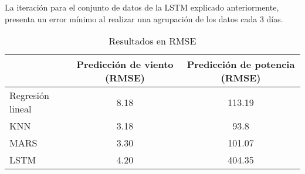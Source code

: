 \documentclass[journal]{IEEEtran}
\begin{document}
La iteración para el conjunto de datos de la LSTM explicado anteriormente, presenta un error mínimo al realizar una agrupación de los datos cada 3 días.

\begin{table}[ht]
\centering
\caption{Resultados en RMSE}\label{t:resRMSE}
\begin{tabular}{|l|c|c|}
\hline
& Predicción de viento (RMSE) & Predicción de potencia (RMSE)\\ \hline
Regresión lineal & 8.18 & 113.19 \\ \hline
KNN & 3.18 & 93.8 \\ \hline
MARS & 3.30 & 101.07 \\ \hline
LSTM & 4.20 & 404.35 \\ \hline
\end{tabular}
\end{table}

%
%
\end{document}
